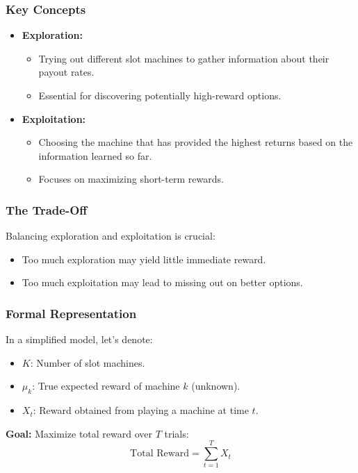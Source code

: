 \documentclass[aspectratio=169]{beamer}
\begin{document}
\begin{frame}[fragile]
    \frametitle{Key Concepts}
    \begin{itemize}
        \item \textbf{Exploration:}
            \begin{itemize}
                \item Trying out different slot machines to gather information about their payout rates.
                \item Essential for discovering potentially high-reward options.
            \end{itemize}
        \item \textbf{Exploitation:}
            \begin{itemize}
                \item Choosing the machine that has provided the highest returns based on the information learned so far.
                \item Focuses on maximizing short-term rewards.
            \end{itemize}
    \end{itemize}
\end{frame}

\begin{frame}[fragile]
    \frametitle{The Trade-Off}
    Balancing exploration and exploitation is crucial:
    \begin{itemize}
        \item Too much exploration may yield little immediate reward.
        \item Too much exploitation may lead to missing out on better options.
    \end{itemize}
\end{frame}

\begin{frame}[fragile]
    \frametitle{Formal Representation}
    In a simplified model, let’s denote:
    \begin{itemize}
        \item \( K \): Number of slot machines.
        \item \( \mu_k \): True expected reward of machine \( k \) (unknown).
        \item \( X_t \): Reward obtained from playing a machine at time \( t \).
    \end{itemize}

    \textbf{Goal:} Maximize total reward over \( T \) trials:
    \begin{equation}
        \text{Total Reward} = \sum_{t=1}^{T} X_t
    \end{equation}
\end{frame}
\end{document}
